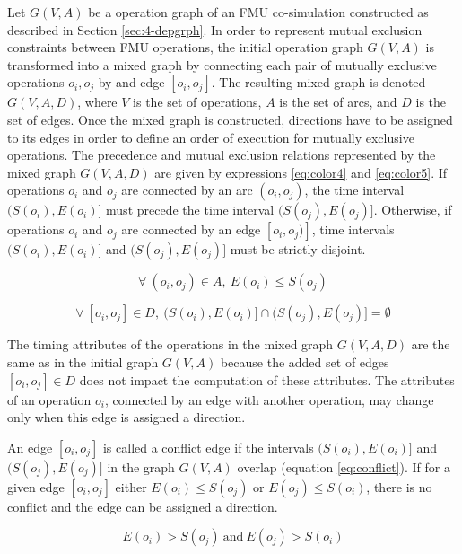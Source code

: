 Let $G(V,A)$ be a operation graph of an FMU co-simulation constructed as described in Section \ref{sec:4-depgrph}. In order to represent mutual exclusion constraints between FMU operations, the initial operation graph $G(V,A)$ is transformed into a mixed graph by connecting each pair of mutually exclusive operations $o_i, o_j$ by and edge $[o_i, o_j]$. The resulting mixed graph is denoted $G(V,A,D)$, where $V$ is the set of operations, $A$ is the set of arcs, and $D$ is the set of edges. Once the mixed graph is constructed, directions have to be assigned to its edges in order to define an order of execution for mutually exclusive operations. The precedence and mutual exclusion relations represented by the mixed graph $G(V,A,D)$ are given by expressions \ref{eq:color4} and \ref{eq:color5}. If operations $o_i$ and $o_j$ are connected by an arc $(o_i,o_j)$, the time interval $(S(o_i), E(o_i)]$ must precede the time interval $(S(o_j), E(o_j)]$. Otherwise, if operations $o_i$ and $o_j$ are connected by an edge $[o_i,o_j)]$, time intervals $(S(o_i), E(o_i)]$ and $(S(o_j), E(o_j)]$ must be strictly disjoint.

\begin{equation}
\forall\ (o_i,o_j) \in A,\ E(o_i) \leq S(o_j)
\label{eq:color4}
\end{equation}

\begin{equation}
\forall\ [o_i,o_j] \in D,\  (S(o_i), E(o_i)] \cap (S(o_j), E(o_j)] = \emptyset
\label{eq:color5}
\end{equation}

The timing attributes of the operations in the mixed graph $G(V,A,D)$ are the same as in the initial graph $G(V,A)$ because the added set of edges $[o_i, o_j] \in D$ does not impact the computation of these attributes. The attributes of an operation $o_i$, connected by an edge with another operation, may change only when this edge is assigned a direction. 

An edge $[o_i,o_j]$ is called a conflict edge if the intervals $(S(o_i), E(o_i)]$ and $(S(o_j), E(o_j)]$ in the graph $G(V,A)$ overlap (equation \ref{eq:conflict}). If for a given edge $[o_i,o_j]$ either $E(o_i) \leq S(o_j)$ or $E(o_j) \leq S(o_i)$, there is no conflict and the edge can be assigned a direction. 

\begin{equation}
E(o_i) > S(o_j)\ \text{and}\ E(o_j) > S(o_i)
\label{eq:conflict}
\end{equation}

